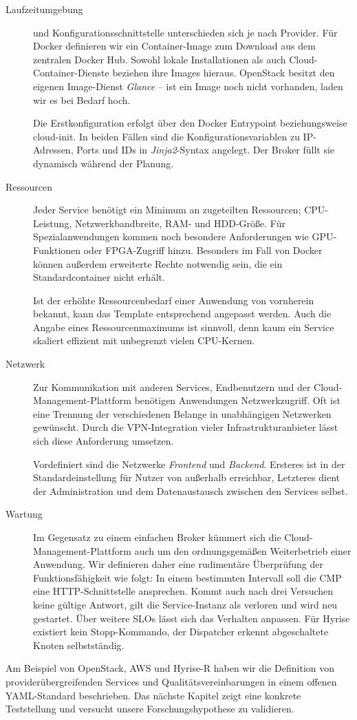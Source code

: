 \begin{description}
	\item[Laufzeitumgebung] und Konfigurationsschnittstelle unterschieden sich je nach Provider. Für Docker definieren wir ein Container-Image zum Download aus dem zentralen Docker Hub. Sowohl lokale Installationen als auch Cloud-Container-Dienste beziehen ihre Images hieraus. OpenStack besitzt den eigenen Image-Dienst \emph{Glance} -- ist ein Image noch nicht vorhanden, laden wir es bei Bedarf hoch.
	
	Die Erstkonfiguration erfolgt über den Docker Entrypoint beziehungsweise cloud-init. In beiden Fällen sind die Konfigurationsvariablen zu IP-Adressen, Ports und IDs in \emph{Jinja2}-Syntax angelegt. Der Broker füllt sie dynamisch während der Planung.
	
	\item[Ressourcen] Jeder Service benötigt ein Minimum an zugeteilten Ressourcen; CPU-Leistung, Netzwerkbandbreite, RAM- und HDD-Größe. Für Spezialanwendungen kommen noch besondere Anforderungen wie GPU-Funktionen oder FPGA-Zugriff hinzu. Besonders im Fall von Docker können außerdem erweiterte Rechte notwendig sein, die ein Standardcontainer nicht erhält. 
	
	Ist der erhöhte Ressourcenbedarf einer Anwendung von vornherein bekannt, kann das Template entsprechend angepasst werden. Auch die Angabe eines Ressourcenmaximums ist sinnvoll, denn kaum ein Service skaliert effizient mit unbegrenzt vielen CPU-Kernen.
	
	\item[Netzwerk] Zur Kommunikation mit anderen Services, Endbenutzern und der Cloud-Management-Plattform benötigen Anwendungen Netzwerkzugriff. Oft ist eine Trennung der verschiedenen Belange in unabhängigen Netzwerken gewünscht. Durch die VPN-Integration vieler Infrastrukturanbieter lässt sich diese Anforderung umsetzen. 
	
	Vordefiniert sind die Netzwerke \emph{Frontend} und \emph{Backend}. Ersteres ist in der Standardeinstellung für Nutzer von außerhalb erreichbar, Letzteres dient der Administration und dem Datenaustausch zwischen den Services selbst.
		
	\item[Wartung] Im Gegensatz zu einem einfachen Broker kümmert sich die Cloud-Man\-age\-ment-Plattform auch um den ordnungsgemäßen Weiterbetrieb einer Anwendung. Wir definieren daher eine rudimentäre Überprüfung der Funktionsfähigkeit wie folgt: In einem bestimmten Intervall soll die CMP eine HTTP-Schnittstelle ansprechen. Kommt auch nach drei Versuchen keine gültige Antwort, gilt die Service-Instanz als verloren und wird neu gestartet. Über weitere SLOs lässt sich das Verhalten anpassen. Für Hyrise existiert kein Stopp-Kommando, der Dispatcher erkennt abgeschaltete Knoten selbstständig.
	
\end{description}

\noindent
Am Beispiel von OpenStack, AWS und Hyrise-R haben wir die Definition von providerübergreifenden Services und Qualitätsvereinbarungen in einem offenen YAML-Standard beschrieben. Das nächste Kapitel zeigt eine konkrete Teststellung und versucht unsere Forschungshypothese zu validieren.
